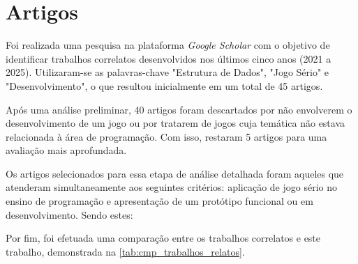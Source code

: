 \section{Artigos}

Foi realizada uma pesquisa na plataforma \emph{Google Scholar} com o objetivo de identificar trabalhos correlatos desenvolvidos nos últimos cinco anos (2021 a 2025). Utilizaram-se as palavras-chave "Estrutura de Dados", "Jogo Sério" e "Desenvolvimento", o que resultou inicialmente em um total de 45 artigos.

Após uma análise preliminar, 40 artigos foram descartados por não envolverem o desenvolvimento de um jogo ou por tratarem de jogos cuja temática não estava relacionada à área de programação. Com isso, restaram 5 artigos para uma avaliação mais aprofundada.

Os artigos selecionados para essa etapa de análise detalhada foram aqueles que atenderam simultaneamente aos seguintes critérios: aplicação de jogo sério no ensino de programação e apresentação de um protótipo funcional ou em desenvolvimento. Sendo estes:

\begin{enumerate}
  
  
  
  
  
\end{enumerate}

 Por fim, foi efetuada uma comparação entre os trabalhos correlatos e este trabalho, demonstrada na \autoref{tab:cmp_trabalhos_relatos}.


